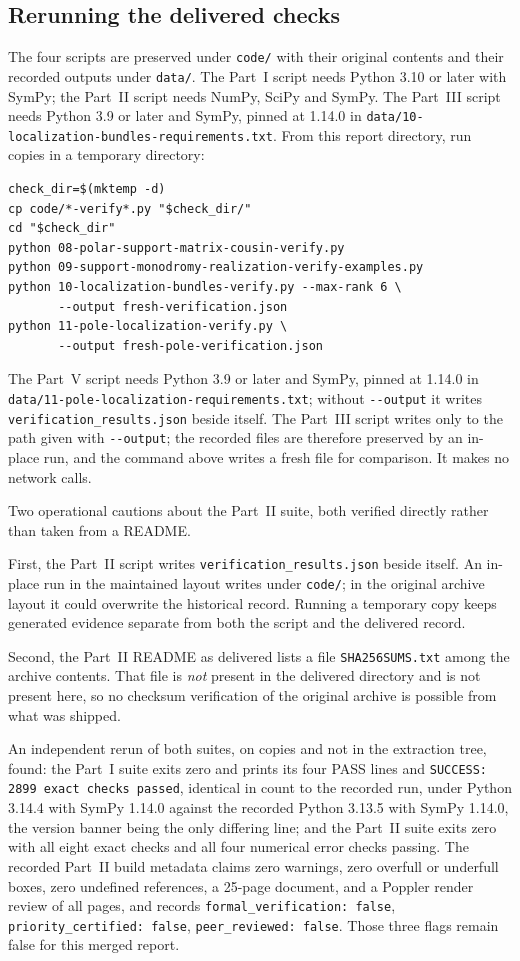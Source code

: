 \documentclass[11pt,letterpaper]{article}
\theoremstyle{definition}
\theoremstyle{remark}
\numberwithin{equation}{section}
\begin{document}
\subsection{Rerunning the delivered checks}

The four scripts are preserved under \texttt{code/} with their original
contents and their recorded outputs under \texttt{data/}. The Part~I script
needs Python 3.10 or later with SymPy; the Part~II script needs NumPy, SciPy
and SymPy. The Part~III script needs Python 3.9 or later and SymPy, pinned
at 1.14.0 in \nolinkurl{data/10-localization-bundles-requirements.txt}.
From this report directory, run copies in a temporary directory:
\begin{verbatim}
check_dir=$(mktemp -d)
cp code/*-verify*.py "$check_dir/"
cd "$check_dir"
python 08-polar-support-matrix-cousin-verify.py
python 09-support-monodromy-realization-verify-examples.py
python 10-localization-bundles-verify.py --max-rank 6 \
       --output fresh-verification.json
python 11-pole-localization-verify.py \
       --output fresh-pole-verification.json
\end{verbatim}
The Part~V script needs Python 3.9 or later and SymPy, pinned at 1.14.0 in
\nolinkurl{data/11-pole-localization-requirements.txt}; without
\texttt{-{}-output} it writes \texttt{verification\_results.json} beside
itself.
The Part~III script writes only to the path given with \texttt{-{}-output}; the
recorded files are therefore preserved by an in-place run, and the command above
writes a fresh file for comparison. It makes no network calls.

Two operational cautions about the Part~II suite, both verified directly rather
than taken from a README.

First, the Part~II script writes \texttt{verification\_results.json} beside
itself. An in-place run in the maintained layout writes under \texttt{code/};
in the original archive layout it could overwrite the historical record.
Running a temporary copy keeps generated evidence separate from both the
script and the delivered record.

Second, the Part~II README as delivered lists a file
\texttt{SHA256SUMS.txt} among the archive contents. That file is
\emph{not} present in the delivered directory and is not present here, so no
checksum verification of the original archive is possible from what was
shipped.

An independent rerun of both suites, on copies and not in the extraction tree,
found: the Part~I suite exits zero and prints its four PASS lines and
\texttt{SUCCESS: 2899 exact checks passed}, identical in count to the recorded
run, under Python 3.14.4 with SymPy 1.14.0 against the recorded Python 3.13.5
with SymPy 1.14.0, the version banner being the only differing line; and the
Part~II suite exits zero with all eight exact checks and all four numerical
error checks passing. The recorded Part~II build metadata claims zero warnings,
zero overfull or underfull boxes, zero undefined references, a 25-page
document, and a Poppler render review of all pages, and records
\texttt{formal\_verification: false}, \texttt{priority\_certified: false},
\texttt{peer\_reviewed: false}. Those three flags remain false for this merged
report.
\end{document}
